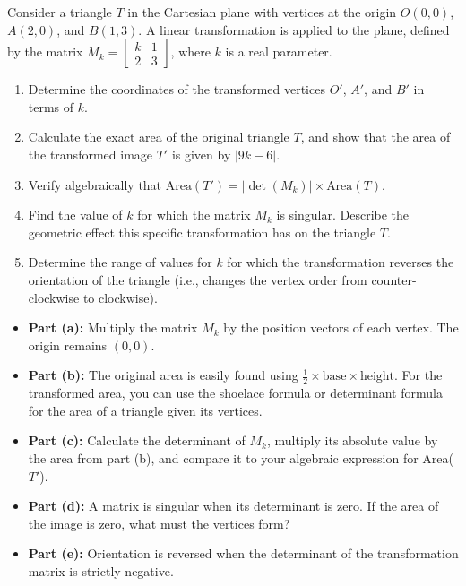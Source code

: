 \begin{problem}
Consider a triangle $T$ in the Cartesian plane with vertices at the origin $O(0,0)$, $A(2,0)$, and $B(1,3)$. A linear transformation is applied to the plane, defined by the matrix 
$M_k = \begin{bmatrix} k & 1 \\ 2 & 3 \end{bmatrix}$, where $k$ is a real parameter.

\begin{enumerate}[label=\textbf{(\alph*)}]
    \item Determine the coordinates of the transformed vertices $O'$, $A'$, and $B'$ in terms of $k$.
    \item Calculate the exact area of the original triangle $T$, and show that the area of the transformed image $T'$ is given by $|9k - 6|$.
    \item Verify algebraically that $\text{Area}(T') = |\det(M_k)| \times \text{Area}(T)$.
    \item Find the value of $k$ for which the matrix $M_k$ is singular. Describe the geometric effect this specific transformation has on the triangle $T$.
    \item Determine the range of values for $k$ for which the transformation reverses the orientation of the triangle (i.e., changes the vertex order from counter-clockwise to clockwise).
\end{enumerate}
\end{problem}

\begin{hint}
\begin{itemize}
    \item \textbf{Part (a):} Multiply the matrix $M_k$ by the position vectors of each vertex. The origin remains $(0,0)$.
    \item \textbf{Part (b):} The original area is easily found using $\frac{1}{2} \times \text{base} \times \text{height}$. For the transformed area, you can use the shoelace formula or determinant formula for the area of a triangle given its vertices.
    \item \textbf{Part (c):} Calculate the determinant of $M_k$, multiply its absolute value by the area from part (b), and compare it to your algebraic expression for Area($T'$).
    \item \textbf{Part (d):} A matrix is singular when its determinant is zero. If the area of the image is zero, what must the vertices form?
    \item \textbf{Part (e):} Orientation is reversed when the determinant of the transformation matrix is strictly negative.
\end{itemize}
\end{hint}

